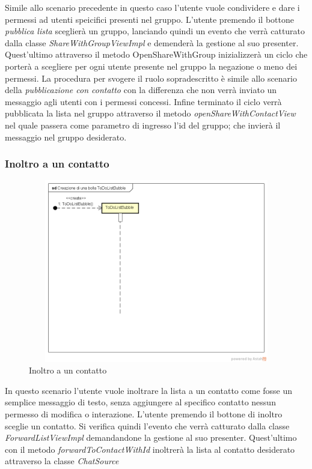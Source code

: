 Simile allo scenario precedente in questo caso l'utente vuole condividere e dare i permessi ad utenti speicifici presenti nel gruppo. L'utente premendo il bottone \textit{pubblica lista} sceglierà un gruppo, lanciando quindi un evento che verrà catturato dalla classe \textit{ShareWithGroupViewImpl}
\newpage e demenderà la gestione al suo presenter. Quest'ultimo attraverso il metodo OpenShareWithGroup inizializzerà un ciclo che porterà a scegliere per ogni utente presente nel gruppo la negazione o meno dei permessi. La procedura per svogere il ruolo sopradescritto è simile allo scenario della \textit{pubblicazione con contatto} con la differenza che non verrà inviato un messaggio agli utenti con i permessi concessi. Infine terminato il ciclo verrà pubblicata la lista nel gruppo attraverso il metodo \textit{openShareWithContactView} nel quale passera come parametro di ingresso l'id del gruppo; che invierà il messaggio nel gruppo desiderato.

\subsubsection{Inoltro a un contatto}

\label{Inoltro a un contatto}
\begin{figure}[ht]
	\centering
	\includegraphics[width=12cm, height=8cm]{Sezioni/Diagrammi/img/Creazione di una bolla ToDoListBubble.png}
	\caption{Inoltro a un contatto}
	
\end{figure}

In questo scenario l'utente vuole inoltrare la lista a un contatto come fosse un semplice messaggio di testo, senza aggiungere al specifico contatto nessun permesso di modifica o interazione. L'utente premendo il bottone di inoltro sceglie un contatto. Si verifica quindi l'evento che verrà catturato dalla classe \textit{ForwardListViewImpl} demandandone la gestione al suo presenter.
Quest'ultimo con il metodo \textit{forwardToContactWithId} inoltrerà la lista al contatto desiderato attraverso la classe \textit{ChatSource} 


